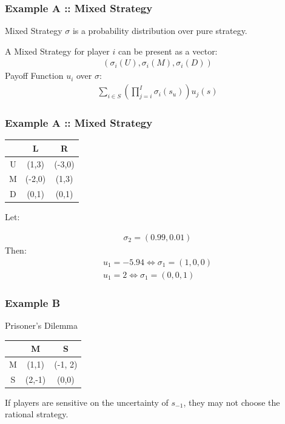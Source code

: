 \documentclass[notheorems, aspectratio=54]{beamer}
\begin{document}
\begin{frame}
  \frametitle{Example A :: Mixed Strategy}

  Mixed Strategy $\sigma$ is a probability distribution over pure strategy.\newline

  A Mixed Strategy for player $i$ can be present as a vector:
  \begin{gather}
    \left(\sigma_i(U), \sigma_i(M), \sigma_i(D)\right) \nonumber
  \end{gather}
  Payoff Function $u_i$ over $\sigma$:
   \begin{gather}
    \sum_{i \in S}\left (\prod_{j=i}^I \sigma_i (s_u)\right)u_j(s) \nonumber
  \end{gather}
 
\end{frame}



\begin{frame}
  \frametitle{Example A :: Mixed Strategy}
    \begin{center}
    \begin{tabular}{c|c|c|}
      & L & R \\
      \hline
      U & (1,3)&(-3,0)\\
      \hline
      M & (-2,0)&(1,3)\\
      \hline
      D & (0,1)&(0,1)\\
    \end{tabular}
  \end{center}
  Let:

  \begin{gather}
    \sigma_2 = (0.99, 0.01) \nonumber
  \end{gather}
  Then:
  \begin{gather}
    u_1 = -5.94 \iff \sigma_1 = (1, 0, 0)  \nonumber \\
    u_1 = 2  \iff \sigma_1 = (0, 0, 1) \nonumber
  \end{gather}

\end{frame}



\begin{frame}
  \frametitle{Example B}

  Prisoner's Dilemma
  \begin{center}
    \begin{tabular}{c|c|c|}
      & M & S \\
      \hline
      M & (1,1)&(-1, 2)\\
      \hline
      S & (2,-1)&(0,0)\\
    \end{tabular}
  \end{center}
  If players are sensitive on the uncertainty of $s_{-1}$, they may not choose the rational strategy.
\end{frame}
\end{document}
